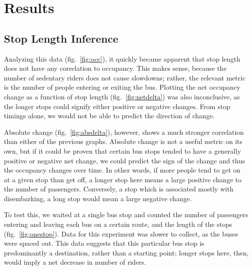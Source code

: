 \section{Results}

\subsection{Stop Length Inference}

Analyzing this data (fig.~\ref{fig:occ}), it quickly became apparent that stop length does not have any correlation to occupancy.
This makes sense, because the number of sedentary riders does not cause slowdowns; rather, the relevant metric is the number of people entering or exiting the bus.
Plotting the net occupancy change as a function of stop length (fig.~\ref{fig:netdelta}) was also inconclusive, as the longer stops could signify either positive or negative changes.
From stop timings alone, we would not be able to predict the direction of change.
    

Absolute change (fig.~\ref{fig:absdelta}), however, shows a much stronger correlation than either of the previous graphs.
Absolute change is not a useful metric on its own, but if it could be proven that certain bus stops tended to have a generally positive or negative net change, we could predict the sign of the change and thus the occupancy changes over time.
In other words, if more people tend to get on at a given stop than get off, a longer stop here means a large positive change to the number of passengers.
Conversely, a stop which is associated mostly with disembarking, a long stop would mean a large negative change.

To test this, we waited at a single bus stop and counted the number of passengers entering and leaving each bus on a certain route, and the length of the stops (fig.~\ref{fig:onestop}).
Data for this experiment was slower to collect, as the buses were spaced out.
This data suggests that this particular bus stop is predominantly a destination, rather than a starting point; longer stops here, then, would imply a net decrease in number of riders.
    
